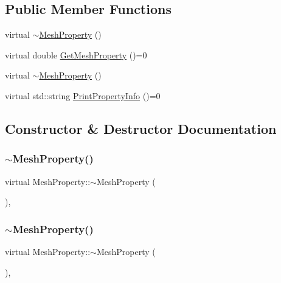 \subsection*{Public Member Functions}
\begin{DoxyCompactItemize}
\item 
virtual \mbox{\hyperlink{class_mesh_property_a4ac7b69cfdacadf447b7db8fcc533736}{$\sim$\+Mesh\+Property}} ()
\item 
virtual double \mbox{\hyperlink{class_mesh_property_a0a50701a5c33ce7aec5c413b409a754f}{Get\+Mesh\+Property}} ()=0
\item 
virtual \mbox{\hyperlink{class_mesh_property_a4ac7b69cfdacadf447b7db8fcc533736}{$\sim$\+Mesh\+Property}} ()
\item 
virtual std\+::string \mbox{\hyperlink{class_mesh_property_aecb4479e9430b8071104fbf7dde0b1c5}{Print\+Property\+Info}} ()=0
\end{DoxyCompactItemize}


\subsection{Constructor \& Destructor Documentation}
\mbox{\label{class_mesh_property_a4ac7b69cfdacadf447b7db8fcc533736}} 
\subsubsection{\texorpdfstring{$\sim$MeshProperty()}{~MeshProperty()}\hspace{0.1cm}{\footnotesize\ttfamily [1/2]}}
{\footnotesize\ttfamily virtual Mesh\+Property\+::$\sim$\+Mesh\+Property (\begin{DoxyParamCaption}{ }\end{DoxyParamCaption})\hspace{0.3cm}{\ttfamily [inline]}, {\ttfamily [virtual]}}

\mbox{\label{class_mesh_property_a4ac7b69cfdacadf447b7db8fcc533736}} 
\subsubsection{\texorpdfstring{$\sim$MeshProperty()}{~MeshProperty()}\hspace{0.1cm}{\footnotesize\ttfamily [2/2]}}
{\footnotesize\ttfamily virtual Mesh\+Property\+::$\sim$\+Mesh\+Property (\begin{DoxyParamCaption}{ }\end{DoxyParamCaption})\hspace{0.3cm}{\ttfamily [inline]}, {\ttfamily [virtual]}}



